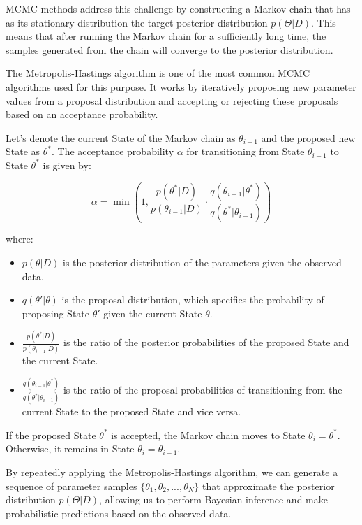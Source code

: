 \documentclass[12pt]{book} %
\begin{document}
MCMC methods address this challenge by constructing a Markov chain that has as its stationary distribution the target posterior distribution $p(\Theta|D)$. This means that after running the Markov chain for a sufficiently long time, the samples generated from the chain will converge to the posterior distribution.

The Metropolis-Hastings algorithm is one of the most common MCMC algorithms used for this purpose. It works by iteratively proposing new parameter values from a proposal distribution and accepting or rejecting these proposals based on an acceptance probability.

Let's denote the current State of the Markov chain as $\theta_{i-1}$ and the proposed new State as $\theta^*$. The acceptance probability $\alpha$ for transitioning from State $\theta_{i-1}$ to State $\theta^*$ is given by:

\[
\alpha = \min\left(1, \frac{p(\theta^*|D)}{p(\theta_{i-1}|D)} \cdot \frac{q(\theta_{i-1}|\theta^*)}{q(\theta^*|\theta_{i-1})}\right)
\]

where:
\begin{itemize}
    \item $p(\theta|D)$ is the posterior distribution of the parameters given the observed data.
    \item $q(\theta'|\theta)$ is the proposal distribution, which specifies the probability of proposing State $\theta'$ given the current State $\theta$.
    \item $\frac{p(\theta^*|D)}{p(\theta_{i-1}|D)}$ is the ratio of the posterior probabilities of the proposed State and the current State.
    \item $\frac{q(\theta_{i-1}|\theta^*)}{q(\theta^*|\theta_{i-1})}$ is the ratio of the proposal probabilities of transitioning from the current State to the proposed State and vice versa.
\end{itemize}

If the proposed State $\theta^*$ is accepted, the Markov chain moves to State $\theta_i = \theta^*$. Otherwise, it remains in State $\theta_i = \theta_{i-1}$.

By repeatedly applying the Metropolis-Hastings algorithm, we can generate a sequence of parameter samples $\{\theta_1, \theta_2, ..., \theta_N\}$ that approximate the posterior distribution $p(\Theta|D)$, allowing us to perform Bayesian inference and make probabilistic predictions based on the observed data.
\end{document}
